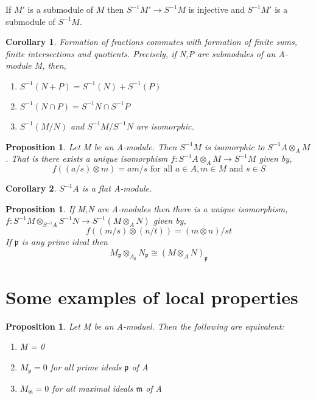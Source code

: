 \documentclass[]{report}
\newtheorem{prop}[theorem]{Proposition}
\newtheorem{corollary}{Corollary}[theorem]
\begin{document}
If $M'$ is a submodule of $M$ then $S^{-1}M' \rightarrow S^{-1}M$ is injective and $S^{-1}M'$ is a submodule of $S^{-1}M$. 

\begin{corollary}
    Formation of fractions commutes with formation of finite sums, finite intersections and quotients. Precisely, if N,P are submodules of an A-module M, then,
    \begin{enumerate}
        \item $S^{-1}(N+P) = S^{-1}(N) + S^{-1}(P)$
        \item $S^{-1}(N\cap P) = S^{-1}N \cap S^{-1}P$
        \item $S^{-1}(M/N)$ and $S^{-1}M / S^{-1}N$ are isomorphic.
    \end{enumerate}
\end{corollary}

\begin{prop}
    Let M be an A-module. Then $S^{-1}M$ is isomorphic to $S^{-1}A \otimes_A M$. That is there exists a unique isomorphism $f:S^{-1}A \otimes_A M \rightarrow S^{-1}M$ given by,
$$f((a/s)\otimes m) = am/s \text{ for all } a\in A, m\in M \text{ and } s\in S$$
\end{prop}

\begin{corollary}
    $S^{-1}A$ is a flat A-module.
\end{corollary}

\begin{prop} 
    If M,N are A-modules then there is a unique isomorphism, $f: S^{-1}M\otimes_{S^{-1}A} S^{-1}N \rightarrow S^{-1}(M\otimes_A N)$ given by,
$$f((m/s)\otimes (n/t)) = (m\otimes n)/st$$
If $\mathfrak{p}$ is any prime ideal then
$$M_\mathfrak{p}\otimes_{A_\mathfrak{p}} N_\mathfrak{p} \cong (M\otimes_A N)_\mathfrak{p}$$
\end{prop}

\section{Some examples of local properties}

\begin{prop}
    Let M be an A-moduel. Then the following are equivalent:
    \begin{enumerate}
        \item M = 0
        \item $M_\mathfrak{p} = 0$ for all prime ideals $\mathfrak{p}$ of A
        \item $M_\mathfrak{m} = 0$ for all maximal ideals $\mathfrak{m}$ of A
    \end{enumerate}
\end{prop}
\end{document}
